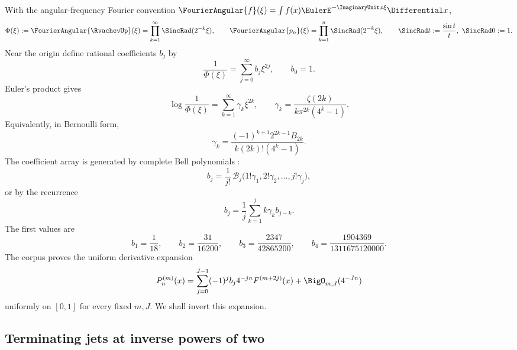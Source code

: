 \documentclass[11pt,oneside]{article}
\numberwithin{equation}{section}
\theoremstyle{definition}
\theoremstyle{remark}
\newcommand{\Fn}{P_n}
\begin{document}
With the angular-frequency Fourier convention
$\FourierAngular{f}(\xi)=\int f(x)\EulerE^{-\ImaginaryUnit x\xi}\Differential x$,
\begin{equation}
 \Phi(\xi):=\FourierAngular{\RvachevUp}(\xi)
 =\prod_{k=1}^{\infty}\SincRad(2^{-k}\xi),
 \qquad
 \FourierAngular{p_n}(\xi)=\prod_{k=1}^{n}\SincRad(2^{-k}\xi),
 \qquad\SincRad t:=\frac{\sin t}{t},\ \SincRad0:=1.
 \label{p1:eq:Phi-products}
\end{equation}
Near the origin define rational coefficients $b_j$ by
\begin{equation}
 \frac1{\Phi(\xi)}=\sum_{j=0}^{\infty}b_j\xi^{2j},
 \qquad b_0=1.
 \label{p1:eq:b-def}
\end{equation}
Euler's product gives
\begin{equation}
 \log\frac1{\Phi(\xi)}=\sum_{k=1}^{\infty}\gamma_k\xi^{2k},
 \qquad
 \gamma_k=\frac{\zeta(2k)}{k\pi^{2k}(4^k-1)}.
 \label{p1:eq:gamma-def}
\end{equation}
Equivalently, in Bernoulli form,
\begin{equation}
 \gamma_k=\frac{(-1)^{k+1}2^{2k-1}B_{2k}}
 {k(2k)!(4^k-1)}.
 \label{p1:eq:gamma-Bernoulli}
\end{equation}
The coefficient array is generated by complete Bell polynomials \cite{p1:Comtet}:
\begin{equation}
 \boxed{
 b_j=\frac1{j!}\,
 \mathcal B_j\bigl(1!\gamma_1,2!\gamma_2,\ldots,j!\gamma_j\bigr),}
 \label{p1:eq:b-Bell}
\end{equation}
or by the recurrence
\begin{equation}
 b_j=\frac1j\sum_{k=1}^{j}k\gamma_kb_{j-k}.
 \label{p1:eq:b-rec}
\end{equation}
The first values are
\begin{equation}
 b_1=\frac1{18},\qquad
 b_2=\frac{31}{16200},\qquad
 b_3=\frac{2347}{42865200},\qquad
 b_4=\frac{1904369}{1311675120000}.
 \label{p1:eq:b-first}
\end{equation}
The corpus proves the uniform derivative expansion
\begin{equation}
 \Fn^{(m)}(x)=
 \sum_{j=0}^{J-1}(-1)^jb_j4^{-jn}F^{(m+2j)}(x)
 +\BigO_{m,J}(4^{-Jn})
 \label{p1:eq:forward-prefix-expansion}
\end{equation}
uniformly on $[0,1]$ for every fixed $m,J$.  We shall invert this expansion.

\subsection{Terminating jets at inverse powers of two}
\end{document}
